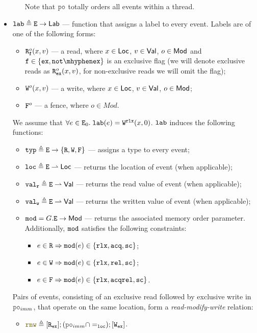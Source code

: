\documentclass[12pt]{article}
\begin{document}
\begin{definition}
\begin{itemize}
\begin{itemize}
      Note that $\lPO$ totally orders all events within a thread.
    \end{itemize}

    \item $\lLAB \defeq \lE \fun \Lab$ --- function that assigns a label to every event.
    Labels are of one of the following forms:
    \begin{itemize}
      \item $\rlabExExpl{o}{x}{v}{\mathtt{f}}$ --- a read, where
        $x \in \Loc$, $v \in \Val$, $o \in \Mod$ 
        and $\mathtt{f} \in \{\Ex, \NotEx\}$ is an exclusive flag 
        (we will denote exclusive reads as $\rlabEx{o}{x}{v}$,
        for non-exclusive reads we will omit the flag);
      \item $\wlab{o}{x}{v}$ --- a write, where $x \in \Loc$, $v \in \Val$, $o \in \Mod$;
      \item $\flab{o}$ --- a fence, where $o \in Mod$.
    \end{itemize}
    We assume that $\forall{e} \in \lEo. \; \lLAB(e) = \wlab{\rlx}{x}{0}$.
    $\lLAB$ induces the following functions:
    \begin{itemize}
      \item $\lTYP \defeq \lE \fun \{\lR, \lW, \lF\}$ --- assigns a type to every event;
      \item $\lLOC \defeq \lE \pfun \Loc $ --- returns the location of event (when applicable);
      \item $\lVALR \defeq \lE \pfun \Val$ --- returns the read value of event (when applicable);
      \item $\lVALW \defeq \lE \pfun \Val$ --- returns the written value of event
        (when applicable);
      \item $\lMOD = G.\lE \rightarrow \Mod$ --- returns the associated memory order parameter.
        Additionally, $\lMOD$ satisfies the following constraints:
        \begin{itemize}
        \item $e \in \lR \Rightarrow \lMOD(e) \in \{ \rlx, \acq, \sco \}$;
        \item $e \in \lW \Rightarrow \lMOD(e) \in \{ \rlx, \rel, \sco \}$;
        \item $e \in \lF \Rightarrow \lMOD(e) \in \{ \rlx, \acqrel, \sco \}$.
        \end{itemize}
    \end{itemize}

    Pairs of events, consisting of an exclusive read followed by exclusive write in $\lPO_{imm}$,
    that operate on the same location,
    form a \emph{read-modify-write} relation:
    \begin{itemize}
      \item $\lRMW \defeq [\lR_{\Ex}];(\lPO_{imm} \cap =_{\lLOC});[\lW_{\Ex}]$.
    \end{itemize}


\end{itemize}
\end{definition}
\end{document}
